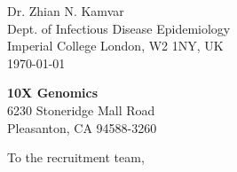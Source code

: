 


\clearpage
\begin{flushright}
  Dr. Zhian N. Kamvar\\
  Dept. of Infectious Disease Epidemiology\\
  Imperial College London, W2 1NY, UK\\
  \today
\end{flushright}

\textbf{10X Genomics}\\
6230 Stoneridge Mall Road\\
Pleasanton, CA 94588-3260





\vspace{1ex}
To the recruitment team,

\vspace{1ex}

